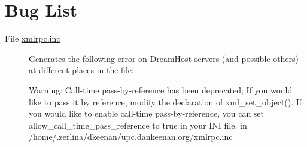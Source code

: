 \hypertarget{bug}{}\section{Bug List}\label{bug}
\label{bug__bug000001}
\hypertarget{bug__bug000001}{}
 \begin{description}
\item[File \hyperlink{xmlrpc_8inc}{xmlrpc.inc} ]Generates the following error on DreamHost servers (and possible others) at different places in the file:\par
 Warning: Call-time pass-by-reference has been deprecated; If you would like to pass it by reference, modify the declaration of xml\_\-set\_\-object(). If you would like to enable call-time pass-by-reference, you can set allow\_\-call\_\-time\_\-pass\_\-reference to true in your INI file. in /home/.zerlina/dkeenan/upc.dankeenan.org/xmlrpc.inc \end{description}

